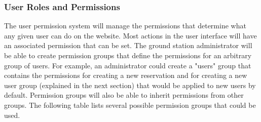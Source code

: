 \documentclass{mxl-design}
\begin{document}
\subsubsection{User Roles and Permissions}
\label{sec:user_permissions}
The user permission system will manage the permissions that determine what any given user can do on the website. Most actions in the user interface will have an associated permission that can be set. The ground station administrator will be able to create permission groups that define the permissions for an arbitrary group of users. For example, an administrator could create a "users" group that contains the permissions for creating a new reservation and for creating a new user group (explained in the next section) that would be applied to new users by default. Permission groups will also be able to inherit permissions from other groups. The following table lists several possible permission groups that could be used.
\end{document}
